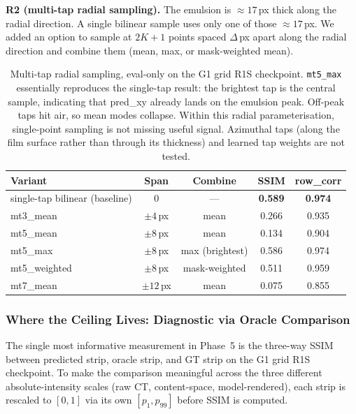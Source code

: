 \documentclass[11pt,a4paper]{article}
\begin{document}
\textbf{R2 (multi-tap radial sampling).} The emulsion is $\approx 17$\,px thick along the radial direction. A single bilinear sample uses only one of those $\approx 17$\,px. We added an option to sample at $2K+1$ points spaced $\Delta$\,px apart along the radial direction and combine them (mean, max, or mask-weighted mean).

\begin{table}[H]
\centering
\begin{tabular}{lcccc}
\toprule
Variant & Span & Combine & SSIM & row\_corr \\
\midrule
single-tap bilinear (baseline) & 0           & ---            & \textbf{0.589} & \textbf{0.974} \\
mt3\_mean         & $\pm 4$\,px  & mean           & 0.266          & 0.935 \\
mt5\_mean         & $\pm 8$\,px  & mean           & 0.134          & 0.904 \\
mt5\_max          & $\pm 8$\,px  & max (brightest) & 0.586          & 0.974 \\
mt5\_weighted     & $\pm 8$\,px  & mask-weighted  & 0.511          & 0.959 \\
mt7\_mean         & $\pm 12$\,px & mean           & 0.075          & 0.855 \\
\bottomrule
\end{tabular}
\caption{Multi-tap radial sampling, eval-only on the G1 grid R1S checkpoint. \texttt{mt5\_max} essentially reproduces the single-tap result: the brightest tap is the central sample, indicating that pred\_xy already lands on the emulsion peak. Off-peak taps hit air, so mean modes collapse. Within this radial parameterisation, single-point sampling is not missing useful signal. Azimuthal taps (along the film surface rather than through its thickness) and learned tap weights are not tested.}
\label{tab:phase5_multitap}
\end{table}

\subsubsection{Where the Ceiling Lives: Diagnostic via Oracle Comparison}

The single most informative measurement in Phase~5 is the three-way SSIM between predicted strip, oracle strip, and GT strip on the G1 grid R1S checkpoint. To make the comparison meaningful across the three different absolute-intensity scales (raw CT, content-space, model-rendered), each strip is rescaled to $[0,1]$ via its own $[p_1, p_{99}]$ before SSIM is computed.
\end{document}
